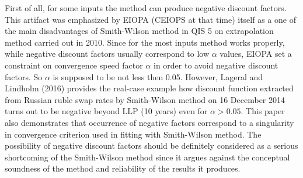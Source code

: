 	First of all, for some inputs the method can produce negative discount factors. 
	This artifact was emphasized by EIOPA (CEIOPS at that time) itself as a one of the main disadvantages of Smith-Wilson method in QIS 5 on extrapolation method carried out in 2010. 
	 Since for the most inputs method works properly, while negative discount factors usually correspond to low $\alpha$ values,  EIOPA set a constraint on convergence speed factor $\alpha$ in order to avoid negative discount factors.
	 So $\alpha$ is supposed to be not less then 0.05.  
	 However, Lageral and Lindholm (2016) provides the real-case example how discount function extracted from Russian ruble swap rates by Smith-Wilson method on 16 December 2014 turns out to be negative beyond LLP (10 years) even for $\alpha > 0.05$.  
	 This paper also demonstrates that occurrence of negative factors correspond to a singularity in convergence criterion used in fitting with Smith-Wilson method.
	 The possibility of negative discount factors should be definitely considered as a serious shortcoming of the Smith-Wilson method since it argues against the conceptual soundness of the method and reliability of the results it produces.
	 
